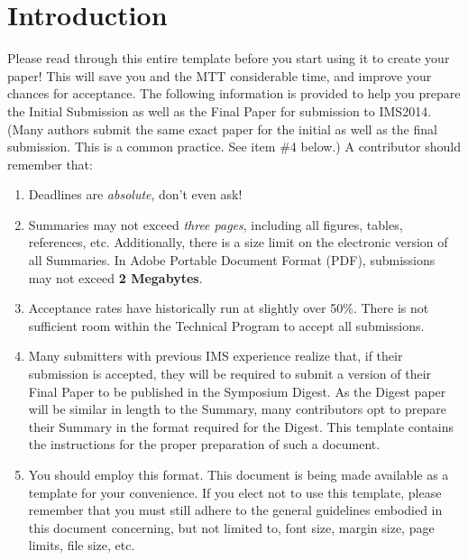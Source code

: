 \documentclass[conference]{IEEEtran}
\begin{document}
\section{Introduction}
Please read through this entire template before you start using it to create your paper! This will save you and the MTT considerable time, and improve your chances for acceptance. The following information is provided to help you prepare the Initial Submission as well as the Final Paper for submission to IMS2014. (Many authors submit the same exact paper for the initial as well as the final submission. This is a common practice. See item \#4 below.) A contributor should remember that:
\begin{enumerate}
 \setlength{\itemsep}{-2ex}
 \setlength{\parskip}{0ex}
 \setlength{\parsep}{0ex}
\item Deadlines are {\itshape absolute}, don't even ask!\hfil\break
\item Summaries may not exceed {\itshape three pages}, including all figures, tables, references, etc. Additionally, there is a size limit on the electronic version of all Summaries. In Adobe Portable Document Format (PDF), submissions may not exceed {\bfseries 2 Megabytes}.\hfil\break
\item Acceptance rates have historically run at slightly over 50\%. There is not sufficient room within the Technical Program to accept all submissions.\hfil\break
\item Many submitters with previous IMS experience realize that, if their submission is accepted, they will be required to submit a version of their Final Paper to be published in the Symposium Digest. As the Digest paper will be similar in length to the Summary, many contributors opt to prepare their Summary in the format required for the Digest. This template contains the instructions for the proper preparation of such a document.\hfil\break
\item You should employ this format. This document is being made available as a template for your convenience. If you elect not to use this template, please remember that you must still adhere to the general guidelines embodied in this document concerning, but not limited to, font size, margin size, page limits, file size, etc.
\end{enumerate}
\end{document}
